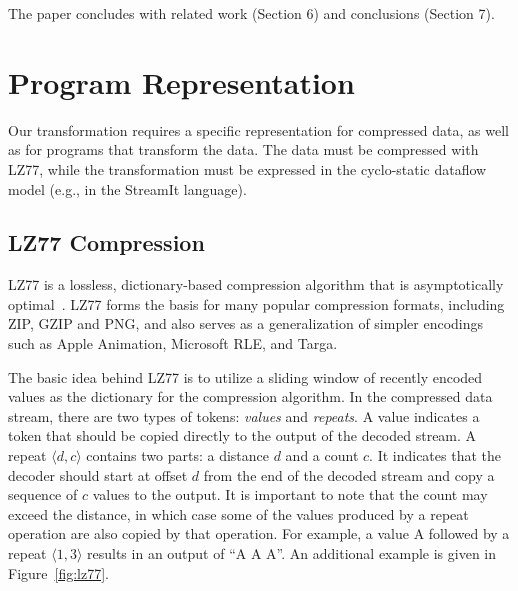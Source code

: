 The paper concludes with related work (Section 6) and conclusions
(Section 7).

\newcommand{\tup}[2]{\langle#1, #2\rangle}

\newcommand{\pos}[0]{\mbox{\it pos}}

\newcommand{\tab}[0]{\mbox{~~~~}}


\section{Program Representation}

Our transformation requires a specific representation for compressed
data, as well as for programs that transform the data.  The data must
be compressed with LZ77, while the transformation must be expressed in
the cyclo-static dataflow model (e.g., in the StreamIt language).

\subsection{LZ77 Compression}

LZ77 is a lossless, dictionary-based compression algorithm that is
asymptotically optimal~\cite{wyner94optimal}.  LZ77 forms the basis
for many popular compression formats, including ZIP, GZIP and PNG, and
also serves as a generalization of simpler encodings such as Apple
Animation, Microsoft RLE, and Targa.

The basic idea behind LZ77 is to utilize a sliding window of recently
encoded values as the dictionary for the compression algorithm.  In
the compressed data stream, there are two types of tokens: {\it
  values} and {\it repeats}.  A value indicates a token that should be
copied directly to the output of the decoded stream.  A repeat
$\langle d, c \rangle$ contains two parts: a distance $d$ and a count
$c$.  It indicates that the decoder should start at offset $d$ from
the end of the decoded stream and copy a sequence of $c$ values to the
output.
It is important to note that the count may exceed the distance, in
which case some of the values produced by a repeat operation are also
copied by that operation.  For example, a value A followed by a repeat
$\tup{1}{3}$ results in an output of ``A A A''.  An additional example
is given in Figure~\ref{fig:lz77}.

